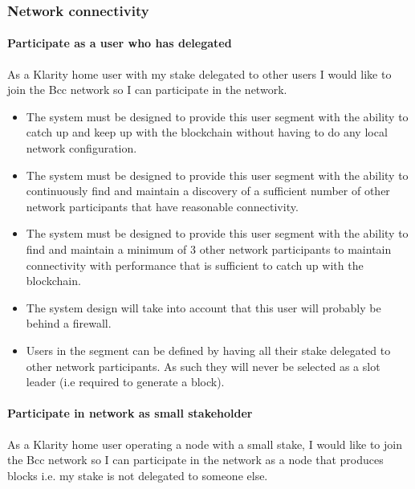 \subsubsection{Network connectivity}\label{network-connectivity}

\paragraph{Participate as a user who has delegated}

As a Klarity home user with my stake delegated to other users
I would like to join the Bcc network so I can participate in the network.
\begin{itemize}
\item The system must be designed to provide this user segment with the ability
      to catch up and keep up with the blockchain without having
      to do any local network configuration.
\item The system must be designed to provide this user segment with the ability to
      continuously find and maintain a discovery of a sufficient number of
      other network participants that have reasonable connectivity.
\item The system must be designed to provide this user segment with the ability to
      find and maintain a minimum of 3 other network participants to maintain
      connectivity with performance that is sufficient to catch up with the
      blockchain.
\item The system design will take into account that this user will probably be
      behind a firewall.
\item Users in the segment can be defined by having all their stake
      delegated to other network participants.
      As such they will never be selected as a slot leader (i.e required to generate a block).
\end{itemize}


\paragraph{Participate in network as small stakeholder}

As a Klarity home user operating a node with a small stake,
I would like to join the Bcc network so I can participate in the network as a
node that produces blocks i.e. my stake is not delegated to someone else.

